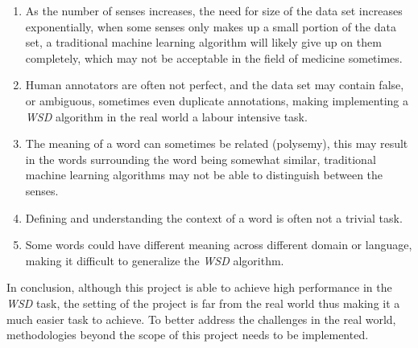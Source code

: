 \documentclass{article}
\begin{document}
    \begin{enumerate}
        \item As the number of senses increases, the need for size of the data set increases exponentially, when some senses only makes up a small portion of the data set, a traditional machine learning algorithm will likely give up on them completely, which may not be acceptable in the field of medicine sometimes.
        \item Human annotators are often not perfect, and the data set may contain false, or ambiguous, sometimes even duplicate annotations, making implementing a \textit{WSD} algorithm in the real world a labour intensive task.
        \item The meaning of a word can sometimes be related (polysemy), this may result in the words surrounding the word being somewhat similar, traditional machine learning algorithms may not be able to distinguish between the senses.
        \item Defining and understanding the context of a word is often not a trivial task.
        \item Some words could have different meaning across different domain or language, making it difficult to generalize the \textit{WSD} algorithm.
    \end{enumerate}
    In conclusion, although this project is able to achieve high performance in the \textit{WSD} task, the setting of the project is far from the real world thus making it a much easier task to achieve. To better address the challenges in the real world, methodologies beyond the scope of this project needs to be implemented.

    \newpage
    \printbibliography
\end{document}
